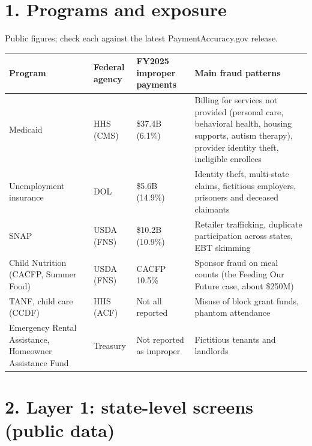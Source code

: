 \documentclass[letterpaper,11pt]{article}
\begin{document}
\hypertarget{programs-and-exposure}{%
\section*{1. Programs and exposure}\label{programs-and-exposure}}

Public figures; check each against the latest PaymentAccuracy.gov
release.

\begingroup\small\setlength{\tabcolsep}{4pt}\renewcommand{\arraystretch}{1.25}
\begin{longtable}[l]{@{}>{\raggedright\arraybackslash}p{}l>{\raggedright\arraybackslash}p{}>{\raggedright\arraybackslash}p{}@{}}
\rowcolor{coolblack}\leavevmode\color{white}\bfseries Program & \leavevmode\color{white}\bfseries \makecell[tl]{Federal\\agency} & \leavevmode\color{white}\bfseries FY2025 improper payments & \leavevmode\color{white}\bfseries Main fraud patterns \\
\endhead
Medicaid & HHS (CMS) & \$37.4B (6.1\%) & Billing for services not provided (personal care, behavioral health, housing supports, autism therapy), provider identity theft, ineligible enrollees \\
Unemployment insurance & DOL & \$5.6B (14.9\%) & Identity theft, multi-state claims, fictitious employers, prisoners and deceased claimants \\
SNAP & USDA (FNS) & \$10.2B (10.9\%) & Retailer trafficking, duplicate participation across states, EBT skimming \\
Child Nutrition (CACFP, Summer Food) & USDA (FNS) & CACFP 10.5\% & Sponsor fraud on meal counts (the Feeding Our Future case, about \$250M) \\
TANF, child care (CCDF) & HHS (ACF) & Not all reported & Misuse of block grant funds, phantom attendance \\
Emergency Rental Assistance, Homeowner Assistance Fund & Treasury & Not reported as improper & Fictitious tenants and landlords \\
\end{longtable}\endgroup

\hypertarget{layer-1-state-level-screens-public-data}{%
\section*{2. Layer 1: state-level screens (public
data)}\label{layer-1-state-level-screens-public-data}}
\end{document}
